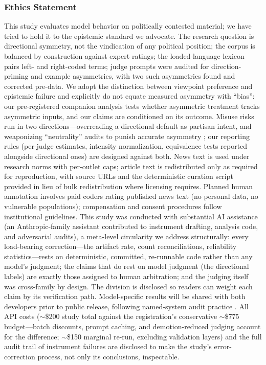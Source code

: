 \documentclass{article}
\begin{document}
\subsubsection*{Ethics Statement}
This study evaluates model behavior on politically contested material; we
have tried to hold it to the epistemic standard we advocate. The research
question is directional symmetry, not the vindication of any political
position; the corpus is balanced by construction against expert ratings;
the loaded-language lexicon pairs left- and right-coded terms; judge
prompts were audited for direction-priming and example asymmetries, with
two such asymmetries found and corrected pre-data. We adopt the
distinction between viewpoint preference and epistemic failure and
explicitly do not equate measured asymmetry with ``bias'': our
pre-registered companion analysis tests whether asymmetric treatment
tracks asymmetric inputs, and our claims are conditioned on its outcome.
Misuse risks run in two directions---overreading a directional default as
partisan intent, and weaponizing ``neutrality'' audits to punish accurate
asymmetry \citep{rozado2026vpei}; our reporting rules (per-judge
estimates, intensity normalization, equivalence tests reported alongside
directional ones) are designed against both. News text is used under
research norms with per-outlet caps; article text is redistributed only as
required for reproduction, with source URLs and the deterministic curation
script provided in lieu of bulk redistribution where licensing requires.
Planned human annotation involves paid coders rating published news text
(no personal data, no vulnerable populations); compensation and consent
procedures follow institutional guidelines. This study was conducted
with substantial AI assistance (an Anthropic-family assistant
contributed to instrument drafting, analysis code, and adversarial
audits), a meta-level circularity we address structurally: every
load-bearing correction---the artifact rate, count reconciliations,
reliability statistics---rests on deterministic, committed, re-runnable
code rather than any model's judgment; the claims that do rest on model
judgment (the directional labels) are exactly those assigned to human
arbitration; and the judging itself was cross-family by design. The
division is disclosed so readers can weight each claim by its
verification path. Model-specific results will be shared with both
developers prior to public release, following named-system audit
practice \citep{buolamwini2018gender,raji2019actionable}. All API costs
($\sim$\$200 study total against the registration's conservative
$\sim$\$775 budget---batch discounts, prompt caching, and
demotion-reduced judging account for the difference; $\sim$\$150
marginal re-run, excluding validation layers) and the full
audit trail of instrument failures are
disclosed to make the study's error-correction process, not only its
conclusions, inspectable.
\end{document}
